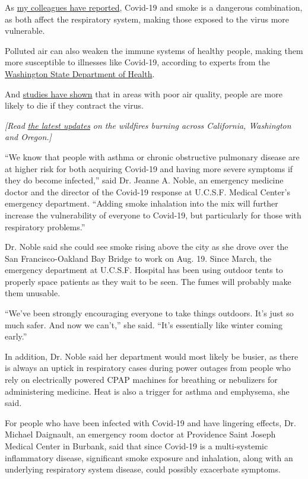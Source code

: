 As
\href{https://www.nytimes3xbfgragh.onion/2020/08/19/us/california-wildfires-vacaville.html}{my
colleagues have reported}, Covid-19 and smoke is a dangerous
combination, as both affect the respiratory system, making those exposed
to the virus more vulnerable.

Polluted air can also weaken the immune systems of healthy people,
making them more susceptible to illnesses like Covid-19, according to
experts from the
\href{https://www.doh.wa.gov/CommunityandEnvironment/AirQuality/SmokeFromFires}{Washington
State Department of Health}.

And
\href{https://www.nytimes3xbfgragh.onion/2020/04/07/climate/air-pollution-coronavirus-covid.html}{studies
have shown} that in areas with poor air quality, people are more likely
to die if they contract the virus.

\emph{{[}Read}
\href{https://www.nytimes3xbfgragh.onion/2020/09/09/us/wildfires-live-updates.html}{\emph{the
latest updates}} \emph{on the wildfires burning across California,
Washington and Oregon.{]}}

``We know that people with asthma or chronic obstructive pulmonary
disease are at higher risk for both acquiring Covid-19 and having more
severe symptoms if they do become infected,'' said Dr. Jeanne A. Noble,
an emergency medicine doctor and the director of the Covid-19 response
at U.C.S.F. Medical Center's emergency department. ``Adding smoke
inhalation into the mix will further increase the vulnerability of
everyone to Covid-19, but particularly for those with respiratory
problems.''

Dr. Noble said she could see smoke rising above the city as she drove
over the San Francisco-Oakland Bay Bridge to work on Aug. 19. Since
March, the emergency department at U.C.S.F. Hospital has been using
outdoor tents to properly space patients as they wait to be seen. The
fumes will probably make them unusable.

``We've been strongly encouraging everyone to take things outdoors. It's
just so much safer. And now we can't,'' she said. ``It's essentially
like winter coming early.''

In addition, Dr. Noble said her department would most likely be busier,
as there is always an uptick in respiratory cases during power outages
from people who rely on electrically powered CPAP machines for breathing
or nebulizers for administering medicine. Heat is also a trigger for
asthma and emphysema, she said.

For people who have been infected with Covid-19 and have lingering
effects, Dr. Michael Daignault, an emergency room doctor at Providence
Saint Joseph Medical Center in Burbank, said that since Covid-19 is a
multi-systemic inflammatory disease, significant smoke exposure and
inhalation, along with an underlying respiratory system disease, could
possibly exacerbate symptoms.

